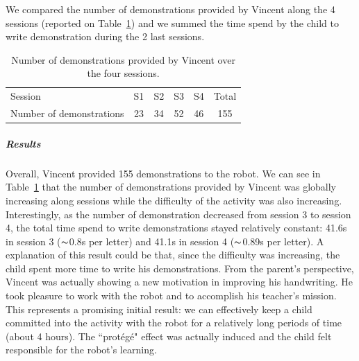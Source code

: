 \documentclass[10pt,a4paper]{article}
\begin{document}
We compared the number of demonstrations provided by Vincent along the 4 sessions (reported on Table~\ref{table:vincent_sess}) and we summed the time spend by the child to write demonstration during the 2 last sessions.
\begin{table}[!]
    \centering
    \caption{\footnotesize Number of demonstrations provided by Vincent over the four sessions.}
    \begin{tabular}{lccccc}
        \toprule
        Session & S1 & S2 & S3 & S4 & Total\\ 
        Number of demonstrations & 23 & 34 & 52 & 46 & 155\\ 
        \bottomrule

    \end{tabular}
    \label{table:vincent_sess}
\end{table}
\subparagraph{Results}
Overall, Vincent provided 155 demonstrations to the robot. We can see in Table~\ref{table:vincent_sess} that the number of demonstrations provided by Vincent was globally increasing along sessions while the difficulty of the activity was also increasing. Interestingly, as the number of demonstration decreased from session 3 to session 4, the total time spend to write demonstrations stayed relatively constant: 41.6s in session 3 ($\thicksim$0.8s per letter) and 41.1s in session 4 ($\thicksim$0.89s per letter). A explanation of this result could be that, since the difficulty was increasing, the child spent more time to write his demonstrations. From the parent's perspective, Vincent was actually showing a new motivation in improving his handwriting. He took pleasure to work with the robot and to accomplish his teacher's mission. This represents a promising initial
result: we can effectively keep a child committed into the activity with the robot for a relatively long periods of time (about 4 hours).
The ``prot\'eg\'e" effect was actually induced and the child felt responsible for the robot's learning.
\end{document}
